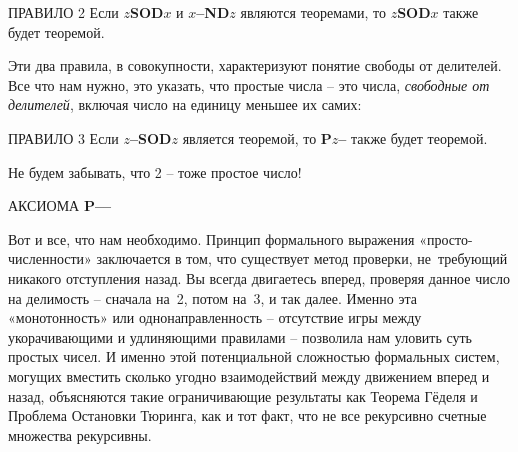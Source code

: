 \documentclass[../main.tex]{subfiles}
\begin{document}
\begin{mybox}{ПРАВИЛО 2}
    Если \textbf{$z$SOD$x$} и \textbf{$x$--ND$z$} являются теоремами, то \textbf{$z$SOD$x$} также будет теоремой.
\end{mybox}

Эти два правила, в совокупности, характеризуют понятие свободы от делителей.
Все что нам нужно, это указать, что простые числа \--- это числа, \emph{свободные от делителей}, включая число на единицу меньшее их самих:

\begin{mybox}{ПРАВИЛО 3}
    Если \textbf{$z$--SOD$z$} является теоремой, то \textbf{P$z$--} также будет теоремой.
\end{mybox}

Не будем забывать, что 2 \--- тоже простое число!

\begin{mybox}{АКСИОМА}
    \textbf{P--{}--}
\end{mybox}

Вот и все, что нам необходимо.
Принцип формального выражения «просто-численности» заключается в том, что существует метод проверки, не~требующий никакого отступления назад.
Вы всегда двигаетесь вперед, проверяя данное число на делимость \--- сначала на~2, потом на~3, и так далее.
Именно эта «монотонность» или однонаправленность \--- отсутствие игры между укорачивающими и удлиняющими правилами \--- позволила нам уловить суть простых чисел.
И именно этой потенциальной сложностью формальных систем, могущих вместить сколько угодно взаимодействий между движением вперед и назад, объясняются такие ограничивающие результаты как Теорема Гёделя и Проблема Остановки Тюринга, как и тот факт, что не все рекурсивно счетные множества рекурсивны.
\end{document}
